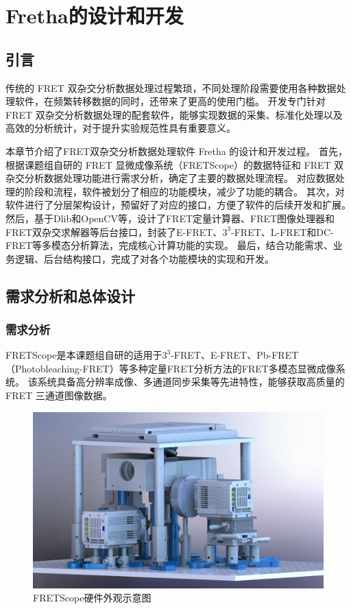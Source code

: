 \chapter{Fretha的设计和开发}

\section{引言}
传统的 FRET 双杂交分析数据处理过程繁琐，不同处理阶段需要使用各种数据处理软件，在频繁转移数据的同时，还带来了更高的使用门槛。
开发专门针对 FRET 双杂交分析数据处理的配套软件，能够实现数据的采集、标准化处理以及高效的分析统计，对于提升实验规范性具有重要意义。

本章节介绍了FRET双杂交分析数据处理软件 Fretha 的设计和开发过程。
首先，根据课题组自研的 FRET 显微成像系统（FRETScope）的数据特征和 FRET 双杂交分析数据处理功能进行需求分析，确定了主要的数据处理流程。
对应数据处理的阶段和流程，软件被划分了相应的功能模块，减少了功能的耦合。
其次，对软件进行了分层架构设计，预留好了对应的接口，方便了软件的后续开发和扩展。
然后，基于Dlib和OpenCV等，设计了FRET定量计算器、FRET图像处理器和FRET双杂交求解器等后台接口，封装了E-FRET、$3^3$-FRET、L-FRET和DC-FRET等多模态分析算法，完成核心计算功能的实现。
最后，结合功能需求、业务逻辑、后台结构接口，完成了对各个功能模块的实现和开发。

\section{需求分析和总体设计}

\subsection{需求分析}
FRETScope是本课题组自研的适用于$3^3$-FRET、E-FRET、Pb-FRET（Photobleaching-FRET）等多种定量FRET分析方法的FRET多模态显微成像系统。
该系统具备高分辨率成像、多通道同步采集等先进特性，能够获取高质量的 FRET 三通道图像数据。
\begin{figure}[hbtp]
  \centering
  \includegraphics[width=0.9\linewidth]{../figures/2/FRETScope示意图.jpg}
  \caption{FRETScope硬件外观示意图}
  \label{fig:fretscope2硬件示意图}
\end{figure}

